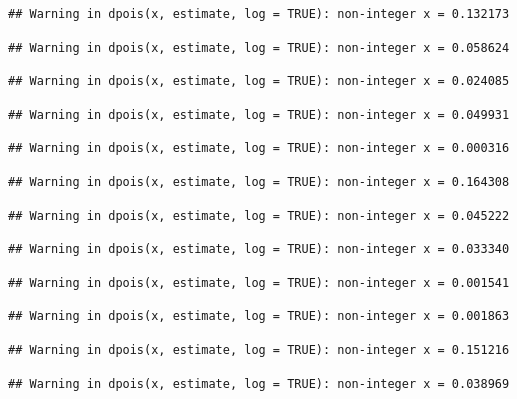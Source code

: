 \documentclass[]{article}
\begin{document}
\begin{verbatim}
## Warning in dpois(x, estimate, log = TRUE): non-integer x = 0.132173
\end{verbatim}

\begin{verbatim}
## Warning in dpois(x, estimate, log = TRUE): non-integer x = 0.058624
\end{verbatim}

\begin{verbatim}
## Warning in dpois(x, estimate, log = TRUE): non-integer x = 0.024085
\end{verbatim}

\begin{verbatim}
## Warning in dpois(x, estimate, log = TRUE): non-integer x = 0.049931
\end{verbatim}

\begin{verbatim}
## Warning in dpois(x, estimate, log = TRUE): non-integer x = 0.000316
\end{verbatim}

\begin{verbatim}
## Warning in dpois(x, estimate, log = TRUE): non-integer x = 0.164308
\end{verbatim}

\begin{verbatim}
## Warning in dpois(x, estimate, log = TRUE): non-integer x = 0.045222
\end{verbatim}

\begin{verbatim}
## Warning in dpois(x, estimate, log = TRUE): non-integer x = 0.033340
\end{verbatim}

\begin{verbatim}
## Warning in dpois(x, estimate, log = TRUE): non-integer x = 0.001541
\end{verbatim}

\begin{verbatim}
## Warning in dpois(x, estimate, log = TRUE): non-integer x = 0.001863
\end{verbatim}

\begin{verbatim}
## Warning in dpois(x, estimate, log = TRUE): non-integer x = 0.151216
\end{verbatim}

\begin{verbatim}
## Warning in dpois(x, estimate, log = TRUE): non-integer x = 0.038969
\end{verbatim}
\end{document}

